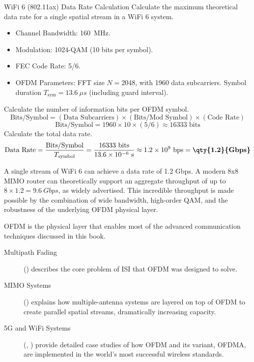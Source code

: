\begin{workedexample}{WiFi 6 (802.11ax) Data Rate Calculation}
     Calculate the maximum theoretical data rate for a single spatial stream in a WiFi 6 system.
    \begin{itemize}
        \item Channel Bandwidth: \qty{160}{MHz}.
        \item Modulation: 1024-QAM (10 bits per symbol).
        \item FEC Code Rate: 5/6.
        \item OFDM Parameters: FFT size $N=2048$, with 1960 data subcarriers. Symbol duration $T_{\text{sym}} = \qty{13.6}{\mu s}$ (including guard interval).
    \end{itemize}
    \begin{derivationsteps}
        \step Calculate the number of information bits per OFDM symbol.
        \[ \text{Bits/Symbol} = (\text{Data Subcarriers}) \times (\text{Bits/Mod Symbol}) \times (\text{Code Rate}) \]
        \[ \text{Bits/Symbol} = 1960 \times 10 \times (5/6) \approx 16333 \text{ bits} \]
        \step Calculate the total data rate.
        \[ \text{Data Rate} = \frac{\text{Bits/Symbol}}{T_{\text{symbol}}} = \frac{16333 \text{ bits}}{13.6 \times 10^{-6} \text{ s}} \approx 1.2 \times 10^9 \text{ bps} = \textbf{\qty{1.2}{Gbps}} \]
    \end{derivationsteps}
     A single stream of WiFi 6 can achieve a data rate of 1.2 Gbps. A modern 8x8 MIMO router can theoretically support an aggregate throughput of up to $8 \times 1.2 = \qty{9.6}{Gbps}$, as widely advertised. This incredible throughput is made possible by the combination of wide bandwidth, high-order QAM, and the robustness of the underlying OFDM physical layer.
\end{workedexample}


\begin{importantbox}[title={Further Reading}]
    OFDM is the physical layer that enables most of the advanced communication techniques discussed in this book.
    \begin{description}
        \item[Multipath Fading] () describes the core problem of ISI that OFDM was designed to solve.
        \item[MIMO Systems] () explains how multiple-antenna systems are layered on top of OFDM to create parallel spatial streams, dramatically increasing capacity.
        \item[5G and WiFi Systems] (, ) provide detailed case studies of how OFDM and its variant, OFDMA, are implemented in the world's most successful wireless standards.
    \end{description}
\end{importantbox}
